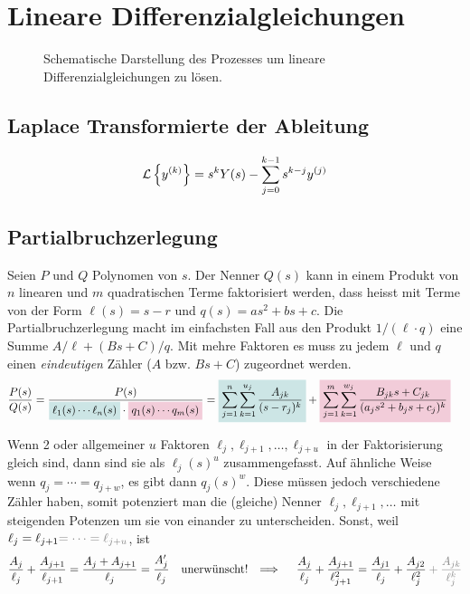 \section{Lineare Differenzialgleichungen}
\begin{figure}[H] \centering
  
  \caption{
    Schematische Darstellung des Prozesses um lineare Differenzialgleichungen
    zu l\"osen.
  }
\end{figure}

\subsection{Laplace Transformierte der Ableitung}
\[
  \mathcal{L}\left\{ y^{(k)} \right\} =
  s^k Y(s) - \sum_{j = 0}^{k - 1} s^{k-j} y^{(j)}
\]

\subsection{Partialbruchzerlegung}
Seien \(P\) und \(Q\) Polynomen von \(s\).
Der Nenner \(Q(s)\) kann in einem Produkt von \(n\) linearen und \(m\)
quadratischen Terme faktorisiert werden, dass heisst mit Terme von der Form
\(\ell (s) = s - r\) und \(q(s) = a s^2 + b s + c\).
%
Die Partialbruchzerlegung macht im einfachsten Fall aus den Produkt
\(1/(\ell \cdot q)\) eine Summe \(A/\ell + (Bs + C)/q\). Mit mehre Faktoren es
muss zu jedem \(\ell\) und \(q\) einen \emph{eindeutigen} Z\"ahler (\(A\) bzw.
\(Bs + C\)) zugeordnet werden.
%
\begin{align*}
  \frac{P(s)}{Q(s)}
  =
  \frac{P(s)}{
    \colorbox{teal!20}{\(
      \ell_1(s)\cdots \ell_n(s)
    \)}
    \cdot
    \colorbox{purple!20}{\(
      q_1(s)\cdots q_m(s)
    \)}
  }
  &=
  \colorbox{teal!20}{\(\displaystyle
    \sum_{j=1}^n \sum_{k=1}^{u_j} \frac{A_{jk}}{(s - r_j)^k}
  \)}
  +
  \colorbox{purple!20}{\(\displaystyle
    \sum_{j=1}^m \sum_{k=1}^{w_j} \frac{B_{jk} s + C_{jk}}{(a_j s^2 + b_j s + c_j)^k}
  \)}
\end{align*}

Wenn 2 oder allgemeiner \(u\) Faktoren \(\ell_j, \ell_{j+1},\dots,\ell_{j+u}\)
in der Faktorisierung gleich sind, dann sind sie als \(\ell_j(s)^{u}\)
zusammengefasst. Auf \"ahnliche Weise wenn \(q_j = \cdots = q_{j+w}\), es gibt dann
\(q_j(s)^{w}\).
%
Diese m\"ussen jedoch verschiedene Z\"ahler haben, somit potenziert man die
(gleiche) Nenner \(\ell_j, \ell_{j+1}, \dots\) mit steigenden Potenzen um sie
von einander zu unterscheiden.
Sonst, weil
\(\ell_j = \ell_{j+1} \textcolor{gray}{= \cdots = \ell_{j+u}}\), ist
\begin{align*}
  \frac{A_j}{\ell_j} + \frac{A_{j+1}}{\ell_{j+1}} =
    \frac{A_j + A_{j+1}}{\ell_j} = \frac{A'_j}{\ell_j}
  \quad\text{unerw\"unscht! }\implies\quad
  \frac{A_j}{\ell_j} + \frac{A_{j+1}}{\ell_{j+1}^2} =
    \frac{A_{j1}}{\ell_j} + \frac{A_{j2}}{\ell_j^2}
      \begingroup\color{gray}
        + \frac{A_{jk}}{\ell_j^k}
      \endgroup
\end{align*}

